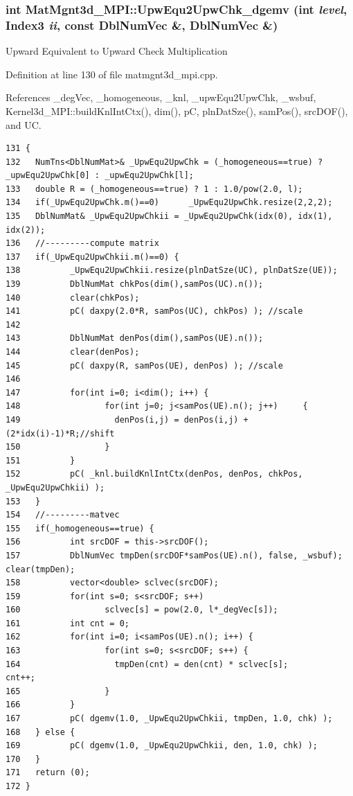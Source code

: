 \subsubsection{\setlength{\rightskip}{0pt plus 5cm}int Mat\-Mgnt3d\_\-MPI::Upw\-Equ2Upw\-Chk\_\-dgemv (int {\em level}, Index3 {\em ii}, const Dbl\-Num\-Vec \&, Dbl\-Num\-Vec \&)}\label{classMatMgnt3d__MPI_c90ec518abbf6f391ef382697c60da9c_c90ec518abbf6f391ef382697c60da9c}


Upward Equivalent to Upward Check Multiplication 

Definition at line 130 of file matmgnt3d\_\-mpi.cpp.

References \_\-deg\-Vec, \_\-homogeneous, \_\-knl, \_\-upw\-Equ2Upw\-Chk, \_\-wsbuf, Kernel3d\_\-MPI::build\-Knl\-Int\-Ctx(), dim(), p\-C, pln\-Dat\-Sze(), sam\-Pos(), src\-DOF(), and UC.

\footnotesize\begin{verbatim}131 {
132   NumTns<DblNumMat>& _UpwEqu2UpwChk = (_homogeneous==true) ? _upwEqu2UpwChk[0] : _upwEqu2UpwChk[l];
133   double R = (_homogeneous==true) ? 1 : 1.0/pow(2.0, l);  
134   if(_UpwEqu2UpwChk.m()==0)      _UpwEqu2UpwChk.resize(2,2,2);
135   DblNumMat& _UpwEqu2UpwChkii = _UpwEqu2UpwChk(idx(0), idx(1), idx(2));
136   //---------compute matrix
137   if(_UpwEqu2UpwChkii.m()==0) {  
138          _UpwEqu2UpwChkii.resize(plnDatSze(UC), plnDatSze(UE)); 
139          DblNumMat chkPos(dim(),samPos(UC).n());
140          clear(chkPos);
141          pC( daxpy(2.0*R, samPos(UC), chkPos) ); //scale
142 
143          DblNumMat denPos(dim(),samPos(UE).n());
144          clear(denPos);
145          pC( daxpy(R, samPos(UE), denPos) ); //scale
146 
147          for(int i=0; i<dim(); i++) {
148                 for(int j=0; j<samPos(UE).n(); j++)     {
149                   denPos(i,j) = denPos(i,j) + (2*idx(i)-1)*R;//shift
150                 }
151          }
152          pC( _knl.buildKnlIntCtx(denPos, denPos, chkPos, _UpwEqu2UpwChkii) );
153   }
154   //---------matvec
155   if(_homogeneous==true) {
156          int srcDOF = this->srcDOF();
157          DblNumVec tmpDen(srcDOF*samPos(UE).n(), false, _wsbuf);         clear(tmpDen);
158          vector<double> sclvec(srcDOF);
159          for(int s=0; s<srcDOF; s++)
160                 sclvec[s] = pow(2.0, l*_degVec[s]);
161          int cnt = 0;
162          for(int i=0; i<samPos(UE).n(); i++) {
163                 for(int s=0; s<srcDOF; s++) {
164                   tmpDen(cnt) = den(cnt) * sclvec[s];             cnt++;
165                 }
166          }
167          pC( dgemv(1.0, _UpwEqu2UpwChkii, tmpDen, 1.0, chk) );
168   } else {
169          pC( dgemv(1.0, _UpwEqu2UpwChkii, den, 1.0, chk) );
170   }
171   return (0);
172 }
\end{verbatim}\normalsize 





